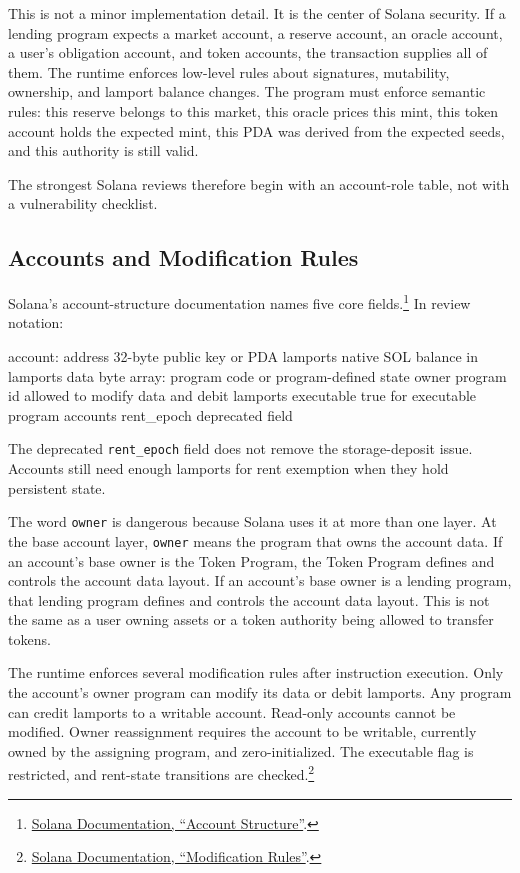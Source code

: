 This is not a minor implementation detail. It is the center of Solana security. If a lending program expects a market account, a reserve account, an oracle account, a user's obligation account, and token accounts, the transaction supplies all of them. The runtime enforces low-level rules about signatures, mutability, ownership, and lamport balance changes. The program must enforce semantic rules: this reserve belongs to this market, this oracle prices this mint, this token account holds the expected mint, this PDA was derived from the expected seeds, and this authority is still valid.

The strongest Solana reviews therefore begin with an account-role table, not with a vulnerability checklist.

\subsection{Accounts and Modification Rules}

Solana's account-structure documentation names five core fields.\footnote{\href{https://solana.com/docs/core/accounts/account-structure}{Solana Documentation, ``Account Structure''}.} In review notation:

\begin{codeblock}
account:
    address       32-byte public key or PDA
    lamports      native SOL balance in lamports
    data          byte array: program code or program-defined state
    owner         program id allowed to modify data and debit lamports
    executable    true for executable program accounts
    rent_epoch    deprecated field
\end{codeblock}

The deprecated \texttt{rent\_epoch} field does not remove the storage-deposit issue. Accounts still need enough lamports for rent exemption when they hold persistent state.

The word \texttt{owner} is dangerous because Solana uses it at more than one layer. At the base account layer, \texttt{owner} means the program that owns the account data. If an account's base owner is the Token Program, the Token Program defines and controls the account data layout. If an account's base owner is a lending program, that lending program defines and controls the account data layout. This is not the same as a user owning assets or a token authority being allowed to transfer tokens.

The runtime enforces several modification rules after instruction execution. Only the account's owner program can modify its data or debit lamports. Any program can credit lamports to a writable account. Read-only accounts cannot be modified. Owner reassignment requires the account to be writable, currently owned by the assigning program, and zero-initialized. The executable flag is restricted, and rent-state transitions are checked.\footnote{\href{https://solana.com/docs/core/accounts/modification-rules}{Solana Documentation, ``Modification Rules''}.}

